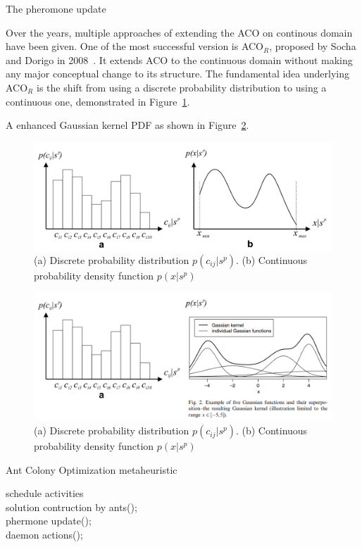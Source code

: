 The pheromone update


Over the years, multiple approaches of extending the ACO on continous domain have been given.
One of the most successful version is ACO$_{R}$, proposed by Socha and Dorigo in 2008~\cite{Socha:2008:ACOR}.
It extends ACO to the continuous domain without making any major conceptual change to its structure.
The fundamental idea underlying ACO$_{R}$ is the shift from using a discrete probability distribution to using a continuous one, demonstrated in Figure~\ref{fig:ACOR_distribution}. 

A enhanced Gaussian kernel PDF as shown in Figure~\ref{fig:ACOR_gaussianKernel}.

\begin{figure}
\centering
\includegraphics[width=\textwidth]{ACOR_distribution}
\caption{(a) Discrete probability distribution $p(c_{ij}|s^{p})$. (b) Continuous probability density function $p(x|s^{p})$}\label{fig:ACOR_distribution}
\end{figure}

\begin{figure}
\centering
\includegraphics[width=\textwidth]{ACOR_gaussianKernel}
\caption{(a) Discrete probability distribution $p(c_{ij}|s^{p})$. (b) Continuous probability density function $p(x|s^{p})$}\label{fig:ACOR_gaussianKernel}
\end{figure}

\begin{algorithm}%
\caption{Ant Colony Optimization metaheuristic}\label{algo:ACO}
 {

    schedule activities \\
    solution contruction by ants(); \\
    phermone update(); \\
    daemon actions(); \\
}
\end{algorithm}



